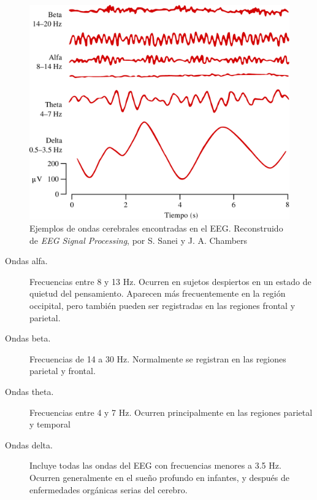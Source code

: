 \begin{figure}
\centering
\includegraphics[width=0.55\linewidth]{./img_diagramas/ritmos_hechos.pdf} 
\caption{Ejemplos de ondas cerebrales encontradas en el EEG. Reconstruido de \textit{EEG Signal 
Processing}, por S. Sanei y J. A. Chambers \cite{Sanei07} }
\label{ritmos}
\end{figure}

\begin{description}
\item[Ondas alfa.] Frecuencias entre 8 y 13 Hz. Ocurren en sujetos despiertos en un estado de 
quietud del pensamiento. 
Aparecen m\'as frecuentemente en la regi\'on occipital, pero tambi\'en 
pueden ser registradas en las regiones frontal y parietal. 

\item[Ondas beta.] Frecuencias de 14 a 30 Hz. Normalmente se registran en las regiones parietal y 
frontal. 

\item[Ondas theta.] Frecuencias entre 4 y 7 Hz. Ocurren principalmente en las regiones parietal y 
temporal 

\item[Ondas delta.] Incluye todas las ondas del EEG con frecuencias menores a 3.5 Hz. Ocurren 
generalmente en el sue\~no profundo en infantes, y despu\'es de enfermedades org\'anicas serias del 
cerebro.
\end{description}


